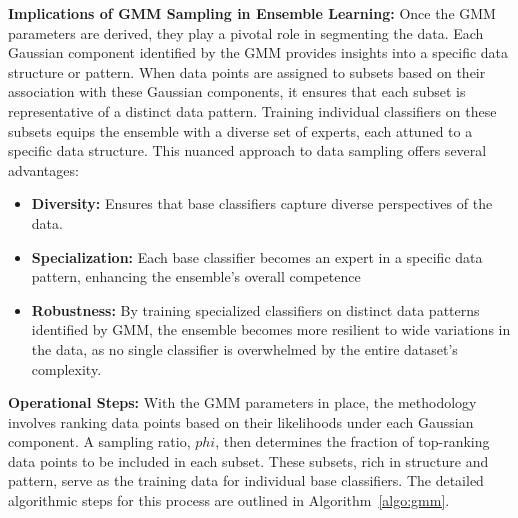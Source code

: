 \documentclass[lettersize,journal]{IEEEtran}
\begin{document}
	\textbf{Implications of GMM Sampling in Ensemble Learning:} Once the
	GMM parameters are derived, they play a pivotal role in segmenting the data.
	Each Gaussian component identified by the GMM provides insights into a
	specific data structure or pattern. When data points are assigned to subsets
	based on their association with these Gaussian components, it ensures that
	each subset is representative of a distinct data pattern. Training individual
	classifiers on these subsets equips the ensemble with a diverse set of experts,
	each attuned to a specific data structure. This nuanced approach to data sampling offers several advantages:
	\begin{itemize}
		\item \textbf{Diversity:} Ensures that base classifiers capture diverse perspectives of the data.
		\item \textbf{Specialization:} Each base classifier becomes an expert in a specific
		data pattern, enhancing the ensemble’s overall competence
		\item \textbf{Robustness:} By training specialized classifiers on distinct data patterns identified by GMM, the ensemble becomes more resilient to wide variations in the data, as no single classifier is overwhelmed by the entire dataset's complexity.
	\end{itemize}
	\textbf{Operational Steps:} With the GMM parameters in place, the methodology involves ranking data points based on their likelihoods under each
	Gaussian component. A sampling ratio, $phi$, then determines the fraction of
	top-ranking data points to be included in each subset. These subsets, rich in
	structure and pattern, serve as the training data for individual base classifiers.
	The detailed algorithmic steps for this process are outlined in Algorithm~\ref{algo:gmm}.
	
\end{document}
